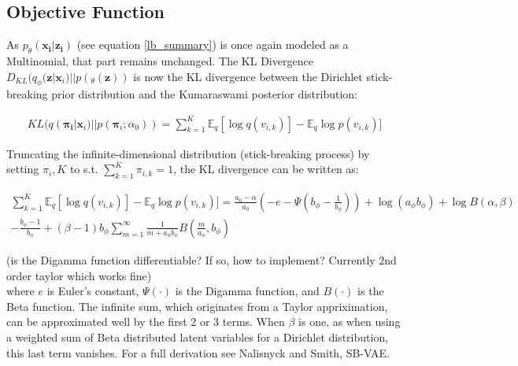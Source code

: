 \documentclass{report}
\begin{document}
\subsection{Objective Function}
As $ p_\theta(\mathbf{x_i}|\mathbf{z_i})$ (see equation \ref{lb_summary}) is once again modeled as a Multinomial, that part  remains unchanged. The KL Divergence $D_{KL}(q_\phi (\mathbf{z}|\mathbf{x}_i)||p(_\theta(\mathbf{z}))$ is now the KL divergence between the Dirichlet stick-breaking prior distribution and the Kumaraswami posterior distribution:

\begin{align}
KL(q(\mathbf{\mathbf{\pi}_i}|\mathbf{x}_i)||p(\mathbf{\pi}_i;\alpha_0)) = \sum_{k=1}^{K}\mathbb{E}_q [\log q(v_{i,k})] - \mathbb{E}_q \log p(v_{i,k})]
\end{align}

Truncating the infinite-dimensional distribution (stick-breaking process) by setting $\pi_i,K$ to s.t. $\sum_{k=1}^{K}\pi_{i,k} = 1$, the KL divergence can be written as:

\begin{align*}
\sum_{k=1}^{K}\mathbb{E}_q [\log q(v_{i,k})] - \mathbb{E}_q \log p(v_{i,k})] = \frac{a_0 -\alpha}{a_0}(-e-\Psi(b_\phi-\frac{1}{b_\phi}))+ \log(a_\phi b_\phi) + \log B(\alpha, \beta) \\
- \frac{b_\phi -1}{b_\phi} 
+ (\beta-1)b_\phi\sum_{m=1}^{\infty}\frac{1}{m+a_\phi b_\phi}B(\frac{m}{a_\phi},b_\phi)
\end{align*}

(is the Digamma function differentiable? If so, how to implement? Currently 2nd order taylor which works fine)\\

where $e$ is Euler’s constant, $\Psi(\cdot)$ is the Digamma function, and $B(\cdot)$ is the Beta function.
The infinite sum, which originates from a Taylor appriximation, can be approximated well by the first 2 or 3 terms. When $\beta$ is one, as when using a weighted sum of Beta distributed latent variables for a Dirichlet distribution, this last term vanishes. For a full derivation see Nalisnyck and Smith, SB-VAE.\\
\end{document}
